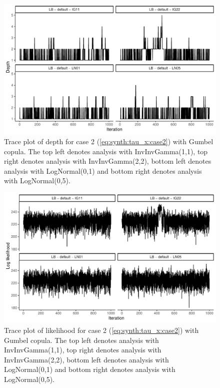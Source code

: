 \documentclass{amsart}
\begin{document}
\begin{figure}
	\centering
	\includegraphics[width = 0.75\linewidth]{trace_case2_gumbel_depth.pdf}
	\caption{Trace plot of depth for case 2 (\cref{eq:synth:tau_x:case2}) with Gumbel copula. The top left denotes analysis with InvInvGamma(1,1), top right denotes analysis with InvInvGamma(2,2), bottom left denotes analysis with LogNormal(0,1) and bottom right denotes analysis with LogNormal(0,5).}
	\label{fig:case2:gumbel:depth}
\end{figure}

\begin{figure}
	\centering
	\includegraphics[width = 0.75\linewidth]{trace_case2_gumbel_like.pdf}
	\caption{Trace plot of likelihood for case 2 (\cref{eq:synth:tau_x:case2}) with Gumbel copula. The top left denotes analysis with InvInvGamma(1,1), top right denotes analysis with InvInvGamma(2,2), bottom left denotes analysis with LogNormal(0,1) and bottom right denotes analysis with LogNormal(0,5).}
	\label{fig:case2:gumbel:like}
\end{figure}
\end{document}
